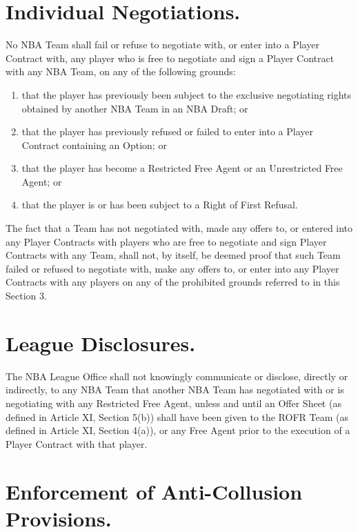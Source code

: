 \documentclass[
]{book}
\providecommand{\tightlist}{%
  \setlength{\itemsep}{0pt}\setlength{\parskip}{0pt}}
\begin{document}
\hypertarget{individual-negotiations.}{%
\section{Individual Negotiations.}\label{individual-negotiations.}}

No NBA Team shall fail or refuse to negotiate with, or enter into a Player Contract with, any player who is free to negotiate and sign a Player Contract with any NBA Team, on any of the following grounds:

\begin{enumerate}
\def\labelenumi{(\alph{enumi})}
\tightlist
\item
  that the player has previously been subject to the exclusive negotiating rights obtained by another NBA Team in an NBA Draft; or
\item
  that the player has previously refused or failed to enter into a Player Contract containing an Option; or
\item
  that the player has become a Restricted Free Agent or an Unrestricted Free Agent; or
\item
  that the player is or has been subject to a Right of First Refusal.
\end{enumerate}

The fact that a Team has not negotiated with, made any offers to, or entered into any Player Contracts with players who are free to negotiate and sign Player Contracts with any Team, shall not, by itself, be deemed proof that such Team failed or refused to negotiate with, make any offers to, or enter into any Player Contracts with any players on any of the prohibited grounds referred to in this Section 3.

\hypertarget{league-disclosures.}{%
\section{League Disclosures.}\label{league-disclosures.}}

The NBA League Office shall not knowingly communicate or disclose, directly or indirectly, to any NBA Team that another NBA Team has negotiated with or is negotiating with any Restricted Free Agent, unless and until an Offer Sheet (as defined in Article XI, Section 5(b)) shall have been given to the ROFR Team (as defined in Article XI, Section 4(a)), or any Free Agent prior to the execution of a Player Contract with that player.

\hypertarget{enforcement-of-anti-collusion-provisions.}{%
\section{Enforcement of Anti-Collusion Provisions.}\label{enforcement-of-anti-collusion-provisions.}}
\end{document}

